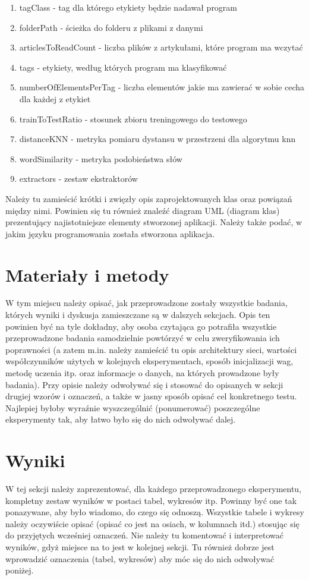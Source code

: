 \documentclass{classrep}
\begin{document}
\begin{enumerate}
\item tagClass - tag dla którego etykiety będzie nadawał program
\item folderPath - ścieżka do folderu z plikami z danymi
\item articlesToReadCount - liczba plików z artykułami, które program ma wczytać
\item tags - etykiety, według których program ma klasyfikować
\item numberOfElementsPerTag - liczba elementów jakie ma zawierać w sobie cecha dla każdej z etykiet
\item trainToTestRatio - stosunek zbioru treningowego do testowego
\item distanceKNN - metryka pomiaru dystansu w przestrzeni dla algorytmu knn
\item wordSimilarity - metryka podobieństwa słów
\item extractors - zestaw ekstraktorów
\end{enumerate}

{\color{blue}
Należy tu zamieścić krótki i zwięzły opis zaprojektowanych klas oraz powiązań
między nimi. Powinien się tu również znaleźć diagram UML  (diagram klas)
prezentujący najistotniejsze elementy stworzonej aplikacji. Należy także
podać, w jakim języku programowania została stworzona aplikacja. }

\section{Materiały i metody}
{\color{blue}
W tym miejscu należy opisać, jak przeprowadzone zostały wszystkie badania,
których wyniki i dyskusja zamieszczane są w dalszych sekcjach. Opis ten
powinien być na tyle dokładny, aby osoba czytająca go potrafiła wszystkie
przeprowadzone badania samodzielnie powtórzyć w celu zweryfikowania ich
poprawności (a zatem m.in. należy zamieścić tu opis architektury sieci,
wartości współczynników użytych w kolejnych eksperymentach, sposób
inicjalizacji wag, metodę uczenia itp. oraz informacje o danych, na których
prowadzone były badania). Przy opisie należy odwoływać się i stosować do
opisanych w sekcji drugiej wzorów i oznaczeń, a także w jasny sposób opisać
cel konkretnego testu. Najlepiej byłoby wyraźnie wyszczególnić (ponumerować)
poszczególne eksperymenty tak, aby łatwo było się do nich odwoływać dalej.}

\section{Wyniki}
{\color{blue}
W tej sekcji należy zaprezentować, dla każdego przeprowadzonego eksperymentu,
kompletny zestaw wyników w postaci tabel, wykresów itp. Powinny być one tak
ponazywane, aby było wiadomo, do czego się odnoszą. Wszystkie tabele i wykresy
należy oczywiście opisać (opisać co jest na osiach, w kolumnach itd.) stosując
się do przyjętych wcześniej oznaczeń. Nie należy tu komentować i interpretować
wyników, gdyż miejsce na to jest w kolejnej sekcji. Tu również dobrze jest
wprowadzić oznaczenia (tabel, wykresów) aby móc się do nich odwoływać
poniżej.}
\end{document}
